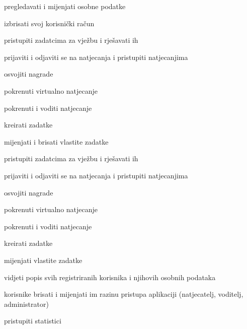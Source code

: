 \begin{packed_enum}
\begin{packed_enum}
				\end{packed_enum}
			
				\item  {}
				
				\begin{packed_enum}
					
					\item pregledavati i mijenjati osobne podatke
					\item izbrisati svoj korisnički račun
					\item pristupiti zadatcima za vježbu i rješavati ih
					\item prijaviti i odjaviti se na natjecanja i pristupiti natjecanjima
					\item osvojiti nagrade
					\item pokrenuti virtualno natjecanje
					\item pokrenuti i voditi natjecanje 
					\item kreirati  zadatke 
					\item mijenjati i brisati vlastite zadatke
					
				\end{packed_enum}
				
				\item  {}
				
				\begin{packed_enum}
					
					\item pristupiti zadatcima za vježbu i rješavati ih
					\item prijaviti i odjaviti se na natjecanja i pristupiti natjecanjima
					\item osvojiti nagrade
					\item pokrenuti virtualno natjecanje
					\item pokrenuti i voditi natjecanje 
					\item kreirati  zadatke 
					\item mijenjati vlastite zadatke
					\item vidjeti popis svih registriranih korisnika i njihovih osobnih podataka
					\item korisnike brisati i mijenjati im razinu pristupa aplikaciji (natjecatelj, voditelj, administrator)
					\item pristupiti statistici
					
					
					
				\end{packed_enum}
			
					
			\end{packed_enum}
			
